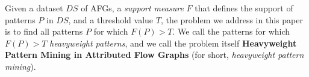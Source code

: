 Given a dataset $DS$ of AFGs, a \emph{support measure} $F$ that defines the support of patterns $P$ in $DS$, and a threshold value $T$, the problem we address in this paper is to find all patterns $P$ for which $F(P) > T$. We call the patterns for which $F(P) > T$ \emph{heavyweight patterns}, and we call the problem itself {\bf Heavyweight Pattern Mining in Attributed Flow Graphs} (for short, \emph{heavyweight pattern mining}).


